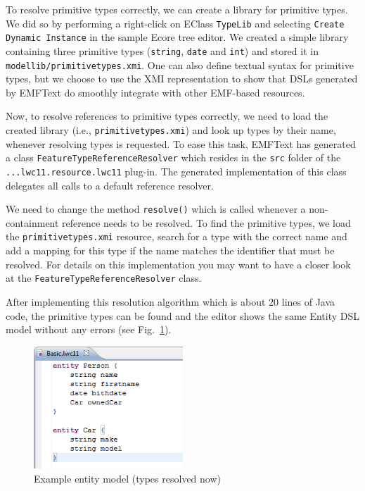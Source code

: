 \documentclass[10pt, pdftex]{llncs}
\begin{document}
To resolve primitive types correctly, we can create a library for primitive
types. We did so by performing a right-click on EClass \texttt{TypeLib}
and selecting \texttt{Create Dynamic Instance} in the sample Ecore tree editor.
We created a simple library containing three primitive types (\texttt{string},
\texttt{date} and \texttt{int}) and stored it in
\texttt{modellib/primitivetypes.xmi}. One can also define textual syntax for
primitive types, but we choose to use the XMI representation to show that
DSLs generated by EMFText do smoothly integrate with other EMF-based resources.

Now, to resolve references to primitive types correctly, we need to load the
created library (i.e., \texttt{primitivetypes.xmi}) and look up types by their
name, whenever resolving types is requested. To ease this task, EMFText has
generated a class \texttt{FeatureTypeReferenceResolver} which resides in the
\texttt{src} folder of the \texttt{...lwc11.resource.lwc11} plug-in. The
generated implementation of this class delegates all calls to a default
reference resolver.

We need to change the method \texttt{resolve()} which is called whenever a
non-containment reference needs to be resolved. To find the primitive types, we
load the \texttt{primitivetypes.xmi} resource, search for a type with the
correct name and add a mapping for this type if the name matches the identifier
that must be resolved. For details on this implementation you may want to have a
closer look at the \texttt{FeatureTypeReferenceResolver} class.

After implementing this resolution algorithm which is about 20 lines of Java
code, the primitive types can be found and the editor shows the same Entity DSL
model without any errors (see Fig.~\ref{fig:example2}).

\begin{figure}
	\centering
	\includegraphics[width=0.50\textwidth]{figures/examplefile2.png}
	\caption{Example entity model (types resolved now)}
	\label{fig:example2}
\end{figure}
\end{document}
